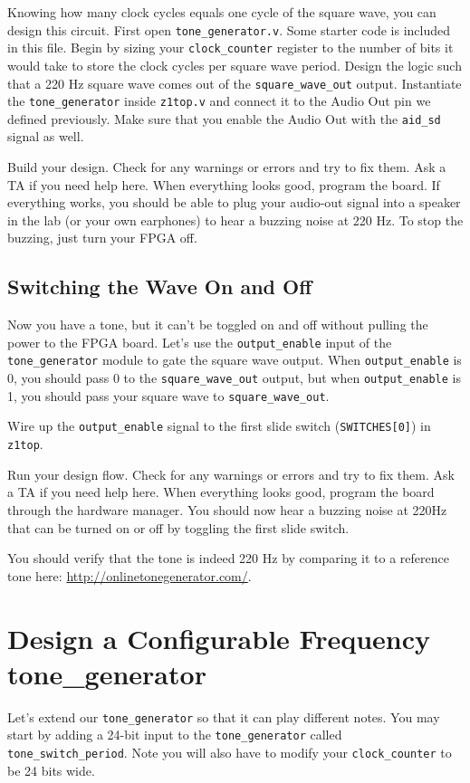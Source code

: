 \documentclass[11pt]{article}
\begin{document}
Knowing how many clock cycles equals one cycle of the square wave, you can design this circuit. First open \verb|tone_generator.v|. Some starter code is included in this file. Begin by sizing your \verb|clock_counter| register to the number of bits it would take to store the clock cycles per square wave period. Design the logic such that a 220 Hz square wave comes out of the \verb|square_wave_out| output. Instantiate the \verb|tone_generator| inside \verb|z1top.v| and connect it to the Audio Out pin we defined previously. Make sure that you enable the Audio Out with the \verb|aid_sd| signal as well.

Build your design. Check for any warnings or errors and try to fix them. Ask a TA if you need help here. When everything looks good, program the board. If everything works, you should be able to plug your audio-out signal into a speaker in the lab (or your own earphones) to hear a buzzing noise at 220 Hz. To stop the buzzing, just turn your FPGA off.

\subsection{Switching the Wave On and Off}
Now you have a tone, but it can't be toggled on and off without pulling the power to the FPGA board. Let's use the \verb|output_enable| input of the \verb|tone_generator| module to gate the square wave output. When \verb|output_enable| is 0, you should pass 0 to the \verb|square_wave_out| output, but when \verb|output_enable| is 1, you should pass your square wave to \verb|square_wave_out|.

Wire up the \verb|output_enable| signal to the first slide switch (\verb|SWITCHES[0]|) in \verb|z1top|.

Run your design flow. Check for any warnings or errors and try to fix them. Ask a TA if you need help here. When everything looks good, program the board through the hardware manager. You should now hear a buzzing noise at 220Hz that can be turned on or off by toggling the first slide switch.

You should verify that the tone is indeed 220 Hz by comparing it to a reference tone here: \url{http://onlinetonegenerator.com/}.

\section{Design a Configurable Frequency tone\_generator}

Let's extend our \verb|tone_generator| so that it can play different notes. You may start by adding a 24-bit input to the \verb|tone_generator| called \verb|tone_switch_period|. Note you will also have to modify your \verb|clock_counter| to be 24 bits wide.
\end{document}
